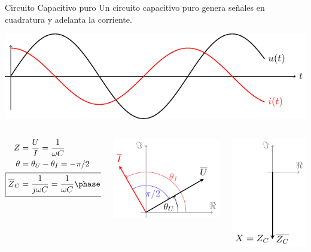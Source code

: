 \documentclass[aspectratio=169, usenames,svgnames,dvipsnames]{beamer}
\begin{document}
\begin{frame}[label={sec:orgb5384ae}]{Circuito Capacitivo puro}
Un circuito capacitivo puro genera \alert{señales en cuadratura} y \alert{adelanta la corriente}.

\begin{center}
\includegraphics[height=0.3\textheight]{../figs/capacitivoPuro.pdf}
\end{center}

\begin{columns}
\begin{column}{0.3\columnwidth}
\begin{align*}
  Z &= \frac{U}{I} = \frac{1}{\omega C}\\
  \theta &= \theta_U - \theta_I = - \pi/2\\
  \Aboxed{\overline{Z}_C &= \frac{1}{j\omega C} = \frac{1}{\omega C}\phase{\ang{-90}}}
\end{align*}
\end{column}


\begin{column}{0.4\columnwidth}
\begin{center}
\includegraphics[height=0.4\textheight]{../figs/fasorCondensador_VI.pdf}
\end{center}
\end{column}


\begin{column}{0.3\columnwidth}
\begin{center}
\includegraphics[height=0.4\textheight]{../figs/fasorCondensador.pdf}
\end{center}
\end{column}
\end{columns}
\end{frame}
\end{document}

